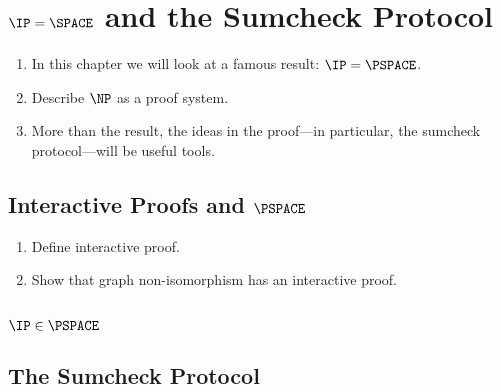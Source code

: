 \chapter{\texorpdfstring{$\IP = \SPACE$}{IP = PSPACE} and the Sumcheck Protocol}\label{lec:07}

\begin{enumerate}
    \item In this chapter we will look at a famous result: $\IP = \PSPACE$.
    \item Describe $\NP$ as a proof system.
    \item More than the result, the ideas in the proof---in particular, the sumcheck protocol---will be useful tools.
\end{enumerate}

\section{Interactive Proofs and \texorpdfstring{$\PSPACE$}{PSPACE}}

\begin{enumerate}
    \item Define interactive proof.
    \item Show that graph non-isomorphism has an interactive proof.
\end{enumerate}

\section{\texorpdfstring{$\IP \in \PSPACE$}{IP in PSPACE}}

\section{The Sumcheck Protocol}